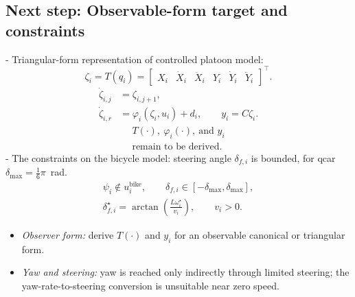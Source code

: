 \documentclass[11pt,a4paper]{article}
\begin{document}
\subsection{Next step: Observable-form target and constraints}
- Triangular-form representation of controlled platoon model:
\begin{equation}
\zeta_i=T(q_i)=
\begin{bmatrix}
X_i&\dot{X}_i&\ddot{X}_i&Y_i&\dot{Y}_i&\ddot{Y}_i
\end{bmatrix}^{\top}.
\label{eq:coordinate-target}
\end{equation}
\begin{equation}
\begin{aligned}
\dot{\zeta}_{i,j}&=\zeta_{i,j+1},\\
\dot{\zeta}_{i,r}&=\varphi_i(\zeta_i,u_i)+d_i,\qquad
y_i=C\zeta_i.
\end{aligned}
\label{eq:triangular-target}
\end{equation}
\begin{equation}
\boxed{\begin{gathered}
T(\cdot),\ \varphi_i(\cdot),\ \text{and }y_i\\
\text{remain to be derived.}
\end{gathered}}
\label{eq:observer-open}
\end{equation}
- The constraints on the bicycle model: steering angle $\delta_{f,i}$ is bounded, for qcar $\delta_{\max}=\frac{1}{6}\pi$~rad.
\begin{equation}
\boxed{\begin{gathered}
\psi_i\notin u_i^{\mathrm{bike}},\qquad
\delta_{f,i}\in[-\delta_{\max},\delta_{\max}],\\
\delta_{f,i}^{\star}=\arctan\!\left(\frac{L\omega_i^{\star}}{v_i}\right),\qquad v_i>0.
\end{gathered}}
\label{eq:steering-constraints}
\end{equation}

{\footnotesize
\begin{itemize}[leftmargin=*,topsep=1pt,itemsep=1pt,parsep=0pt]
    \item \textit{Observer form:} derive $T(\cdot)$ and $y_i$ for an observable canonical or triangular form.
    \item \textit{Yaw and steering:} yaw is reached only indirectly through limited steering; the yaw-rate-to-steering conversion is unsuitable near zero speed.
\end{itemize}}
\end{document}

